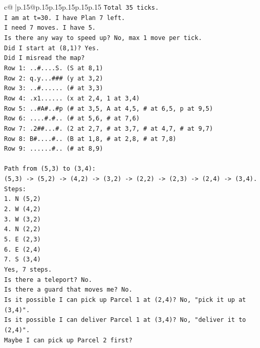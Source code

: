 \documentclass{article}
\begin{document}
{\begin{supertabular}{c@{$\;$}|p{.15\linewidth}@{}p{.15\linewidth}p{.15\linewidth}p{.15\linewidth}p{.15\linewidth}p{.15\linewidth}}
{{{\texttt{Total 35 ticks.} \\
\texttt{I am at t=30. I have Plan 7 left.} \\
\texttt{I need 7 moves. I have 5.} \\
\texttt{Is there any way to speed up? No, max 1 move per tick.} \\
\texttt{Did I start at (8,1)? Yes.} \\
\texttt{Did I misread the map?} \\
\texttt{Row 1: ..\#....S. (S at 8,1)} \\
\texttt{Row 2: q.y...\#\#\# (y at 3,2)} \\
\texttt{Row 3: ..\#...... (\# at 3,3)} \\
\texttt{Row 4: .x1...... (x at 2,4, 1 at 3,4)} \\
\texttt{Row 5: ..\#A\#..\#p (\# at 3,5, A at 4,5, \# at 6,5, p at 9,5)} \\
\texttt{Row 6: ....\#.\#.. (\# at 5,6, \# at 7,6)} \\
\texttt{Row 7: .2\#\#...\#. (2 at 2,7, \# at 3,7, \# at 4,7, \# at 9,7)} \\
\texttt{Row 8: B\#....\#.. (B at 1,8, \# at 2,8, \# at 7,8)} \\
\texttt{Row 9: ......\#.. (\# at 8,9)} \\
\\ 
\texttt{Path from (5,3) to (3,4):} \\
\texttt{(5,3) {-}> (5,2) {-}> (4,2) {-}> (3,2) {-}> (2,2) {-}> (2,3) {-}> (2,4) {-}> (3,4).} \\
\texttt{Steps:} \\
\texttt{1. N (5,2)} \\
\texttt{2. W (4,2)} \\
\texttt{3. W (3,2)} \\
\texttt{4. N (2,2)} \\
\texttt{5. E (2,3)} \\
\texttt{6. E (2,4)} \\
\texttt{7. S (3,4)} \\
\texttt{Yes, 7 steps.} \\
\texttt{Is there a teleport? No.} \\
\texttt{Is there a guard that moves me? No.} \\
\texttt{Is it possible I can pick up Parcel 1 at (2,4)? No, "pick it up at (3,4)".} \\
\texttt{Is it possible I can deliver Parcel 1 at (3,4)? No, "deliver it to (2,4)".} \\
\texttt{Maybe I can pick up Parcel 2 first?} \\
}}}
\end{supertabular}}
\end{document}
